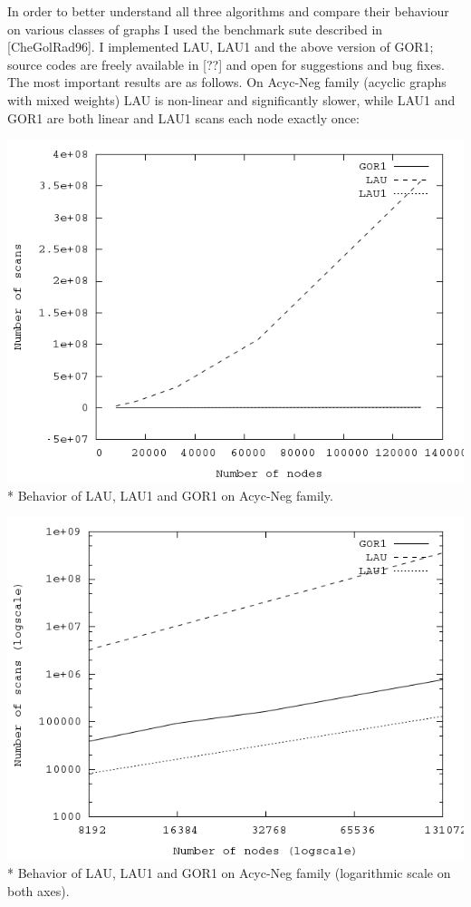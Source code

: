 \documentclass{article}
\theoremstyle{definition}
\begin{document}
\begin{multicols}{2}
In order to better understand all three algorithms and compare their behaviour on various classes of graphs
I used the benchmark sute described in [CheGolRad96].
I implemented LAU, LAU1 and the above version of GOR1;
source codes are freely available in [??] and open for suggestions and bug fixes.
The most important results are as follows.
On Acyc-Neg family (acyclic graphs with mixed weights)
LAU is non-linear and significantly slower,
while LAU1 and GOR1 are both linear and LAU1 scans each node exactly once:

\begin{center}
\includegraphics[width=\linewidth]{img/plot_acyc_neg.png}\\*
\footnotesize{Behavior of LAU, LAU1 and GOR1 on Acyc-Neg family.}
\end{center}

\begin{center}
\includegraphics[width=\linewidth]{img/plot_acyc_neg_logscale.png}\\*
\footnotesize{Behavior of LAU, LAU1 and GOR1 on Acyc-Neg family (logarithmic scale on both axes).}
\end{center}


\end{multicols}
\end{document}
